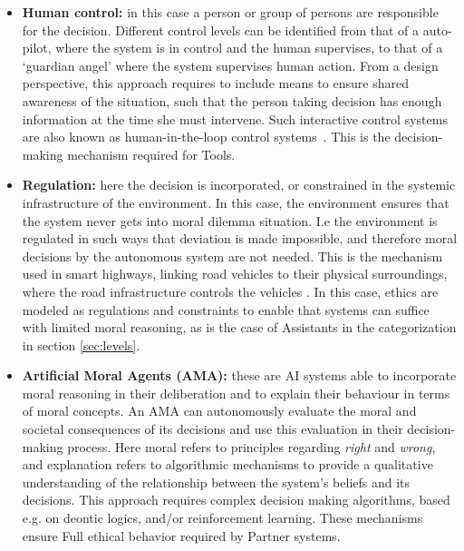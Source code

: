 \documentclass[twocolumn]{article}
\begin{document}
\begin{itemize}
\item \textbf{Human control:} in this case a person or group of persons are responsible for the decision. Different control levels can be identified from that of a auto-pilot, where the system is in control and the human supervises, to that of a `guardian angel' where the system supervises human action. %
From a design perspective, this approach requires to include means to ensure shared awareness of the situation, such that the person taking decision has enough information at the time she must intervene. Such interactive control systems are also known as human-in-the-loop control systems~\cite{Li2014}. This is the decision-making mechanism required for Tools.
\item \textbf{Regulation:} here the decision is incorporated, or constrained in the systemic infrastructure of the environment. In this case, the environment ensures that the system never gets into moral dilemma situation. 
I.e the environment is regulated in such ways that deviation is made impossible, and therefore moral decisions by the autonomous system are not needed. This is the mechanism used in smart highways, linking road vehicles to their physical surroundings, where the road infrastructure controls the vehicles \cite{misener2006path}. In this case, ethics are modeled as regulations and constraints to enable that systems can suffice with limited moral reasoning, as is the case of Assistants in the categorization in section \ref{sec:levels}.
\item \textbf{Artificial Moral Agents (AMA):} these are AI systems able to incorporate moral reasoning in their deliberation and to explain their behaviour in terms of moral concepts. An AMA \cite{wallach2008moral} can autonomously evaluate the moral and societal consequences of its decisions and use this evaluation in their decision-making process. Here moral refers to principles regarding \textit{right} and \textit{wrong}, %
and explanation refers to algorithmic mechanisms to provide a qualitative understanding of the relationship between the system's beliefs and its decisions. This approach requires complex decision making algorithms, based e.g. on deontic logics, and/or reinforcement learning. These mechanisms ensure Full ethical behavior required by Partner systems.

\end{itemize}
\end{document}

